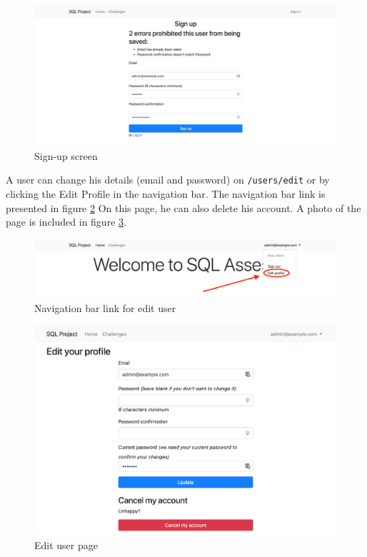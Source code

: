 \begin{figure}
    \centering
    \includegraphics[width=\textwidth/4*3]{Appendices/signup.png}
    \caption{Sign-up screen}
    \label{fig:app:newuser}
\end{figure}

A user can change his details (email and password) on \texttt{/users/edit} or by clicking the Edit Profile in the navigation bar. The navigation bar link is presented in figure \ref{fig:app:editusernavbar} On this page, he can also delete his account. A photo of the page is included in figure \ref{fig:app:edituser}.

\begin{figure}
    \centering
    \includegraphics[width=\textwidth/4*3]{Appendices/editlinknavbar.png}
    \caption{Navigation bar link for edit user}
    \label{fig:app:editusernavbar}
\end{figure}

\begin{figure}
    \centering
    \includegraphics[width=\textwidth/4*3]{Appendices/edituser.png}
    \caption{Edit user page}
    \label{fig:app:edituser}
\end{figure}

